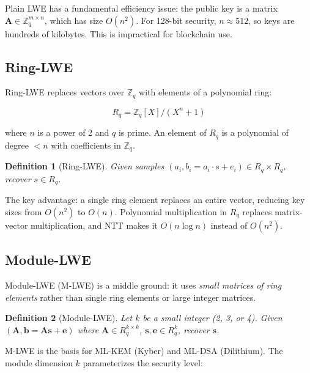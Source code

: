 \documentclass[11pt,a4paper]{article}
\newtheorem{definition}{Definition}
\begin{document}
Plain LWE has a fundamental efficiency issue: the public key is a matrix $\mathbf{A} \in
\mathbb{Z}_q^{m \times n}$, which has size $O(n^2)$. For 128-bit security, $n \approx 512$,
so keys are hundreds of kilobytes. This is impractical for blockchain use.

\subsection{Ring-LWE}

Ring-LWE replaces vectors over $\mathbb{Z}_q$ with elements of a polynomial ring:

\[
R_q = \mathbb{Z}_q[X] / (X^n + 1)
\]

where $n$ is a power of 2 and $q$ is prime. An element of $R_q$ is a polynomial of
degree $< n$ with coefficients in $\mathbb{Z}_q$.

\begin{definition}[Ring-LWE]
Given samples $(a_i, b_i = a_i \cdot s + e_i) \in R_q \times R_q$, recover $s \in R_q$.
\end{definition}

The key advantage: a single ring element replaces an entire vector, reducing key sizes
from $O(n^2)$ to $O(n)$. Polynomial multiplication in $R_q$ replaces matrix-vector
multiplication, and NTT makes it $O(n \log n)$ instead of $O(n^2)$.

\subsection{Module-LWE}

Module-LWE (M-LWE) is a middle ground: it uses \emph{small matrices of ring elements}
rather than single ring elements or large integer matrices.

\begin{definition}[Module-LWE]
Let $k$ be a small integer (2, 3, or 4). Given
$(\mathbf{A}, \mathbf{b} = \mathbf{A}\mathbf{s} + \mathbf{e})$ where
$\mathbf{A} \in R_q^{k \times k}$, $\mathbf{s}, \mathbf{e} \in R_q^k$,
recover $\mathbf{s}$.
\end{definition}

M-LWE is the basis for ML-KEM (Kyber) and ML-DSA (Dilithium). The module dimension $k$
parameterizes the security level:
\end{document}
